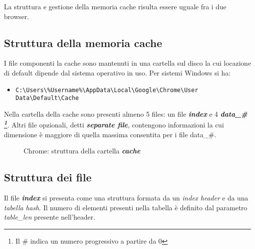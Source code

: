La struttura e gestione della memoria cache risulta essere uguale fra i due browser.

\subsection{Struttura della memoria cache}

I file componenti la cache sono mantenuti in una cartella sul disco la cui locazione di default dipende dal sistema operativo in uso. Per sistemi Windows si ha: 

\begin{itemize}
	\item{\texttt{C:\textbackslash Users\textbackslash\%Username\%\textbackslash AppData\textbackslash Local\textbackslash Google\textbackslash Chrome\textbackslash User Data\textbackslash Default\textbackslash Cache}}
\end{itemize}

Nella cartella della cache sono presenti almeno 5 files: un file \textbf{\textit{index}} e 4 \textbf{\textit{data\_\# \footnote{Il \# indica un numero progressivo a partire da 0}}}. Altri file opzionali, detti \textbf{\textit{separate file}}, contengono informazioni la cui dimensione è maggiore di quella massima consentita per i file data\_\#.

\begin{figure}[h]
	\centering
	\begin{minipage}[c]{0.7\textwidth}
	\end{minipage}
	\caption{Chrome: struttura della cartella \textbf{\textit{cache}}}
\end{figure}

\subsection{Struttura dei file}
Il file \textbf{\textit{index}} si presenta come una struttura formata da un \textit{index header} e da una \textit{tabella hash}. Il numero di elementi presenti nella tabella è definito dal parametro \textit{table\_len} presente nell'header. 

